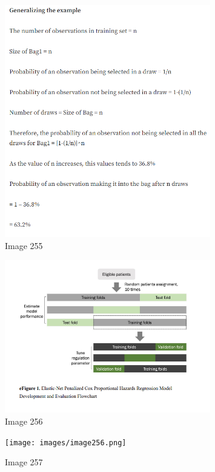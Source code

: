 \documentclass{article}%
\begin{document}
%


\begin{figure}[h!]%
\centering%
\includegraphics[width=0.8\textwidth]{images/image254.png}%
\caption{Image 255}%
\end{figure}

%


\begin{figure}[h!]%
\centering%
\includegraphics[width=0.8\textwidth]{images/image255.png}%
\caption{Image 256}%
\end{figure}

%


\begin{figure}[h!]%
\centering%
\texttt{[image: images/image256.png]}%
\caption{Image 257}%
\end{figure}
\end{document}
